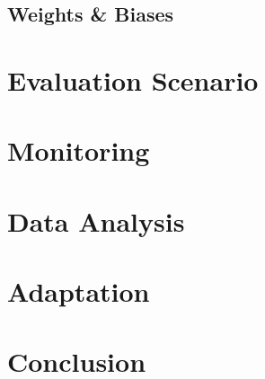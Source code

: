   \subsection{Weights \& Biases}
\section{Evaluation Scenario}
\section{Monitoring}
\section{Data Analysis}
\section{Adaptation}
\section{Conclusion}